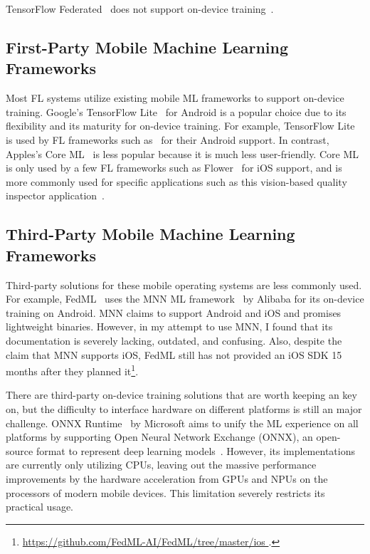 \documentclass[conference]{IEEEtran}
\begin{document}
TensorFlow Federated~\cite{tff} does not support
on-device training~\cite{kholod2020open}.

\subsection{First-Party Mobile Machine Learning Frameworks}

Most FL systems utilize existing mobile ML frameworks to
support on-device training.
Google's TensorFlow Lite~\cite{tensorflow2015-whitepaper,abadi2016tensorflow}
for Android is
a popular choice due to its flexibility and
its maturity for on-device training.
For example, TensorFlow Lite is used by FL frameworks such as~\cite{
    beutel2020flower,mathur2021ondevice,kourtellis2020flaas,katevas2022flaas}
for their Android support.
In contrast, Apples's Core ML~\cite{coreml} is less popular because
it is much less user-friendly.
Core ML is only used by a few FL frameworks such as
Flower~\cite{beutel2020flower} for iOS support,
and is more commonly used for specific applications
such as this vision-based quality inspector application~\cite{bharti2022edge}.

\subsection{Third-Party Mobile Machine Learning Frameworks}

Third-party solutions for these mobile operating systems are less commonly used.
For example, FedML~\cite{he2020fedml} uses
the MNN ML framework~\cite{jiang2020mnn,lv2022walle} by Alibaba for
its on-device training on Android.
MNN claims to support Android and iOS and promises lightweight binaries.
However, in my attempt to use MNN, I found that its documentation is
severely lacking, outdated, and confusing.
Also, despite the claim that MNN supports iOS,
FedML still has not provided an iOS SDK 15 months after they planned
it\footnote{\url{
    https://github.com/FedML-AI/FedML/tree/master/ios
}.}.

There are third-party on-device training solutions that are worth keeping an key on,
but the difficulty to interface hardware on different platforms is
still an major challenge.
ONNX Runtime~\cite{onnxruntime} by Microsoft aims to
unify the ML experience on all platforms by
supporting Open Neural Network Exchange (ONNX),
an open-source format to represent deep learning
models~\cite{ParedesdelRio2020}.
However, its implementations are currently only utilizing CPUs,
leaving out the massive performance improvements by the hardware acceleration
from GPUs and NPUs on the processors of modern mobile devices.
This limitation severely restricts its practical usage.
\end{document}
